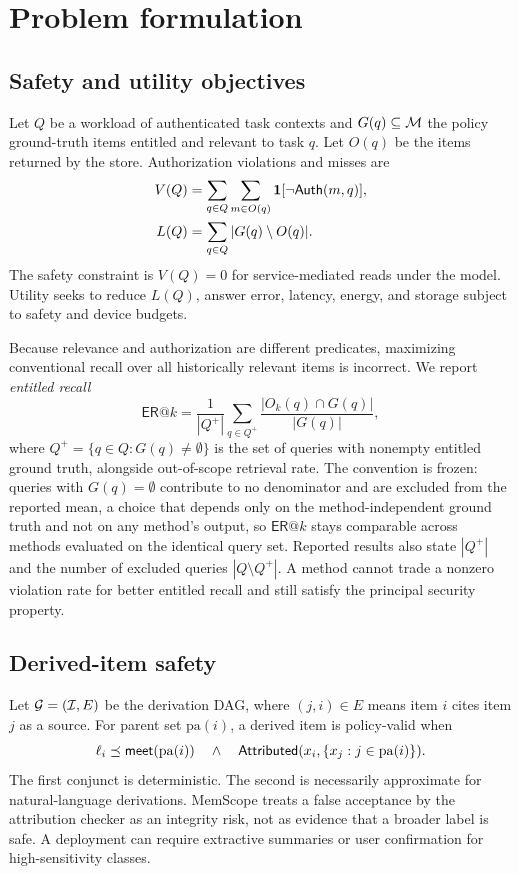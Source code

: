 \section{Problem formulation}
\label{sec:problem}

\subsection{Safety and utility objectives}

Let $Q$ be a workload of authenticated task contexts and $G(q)\subseteq\mathcal{M}$ the policy ground-truth items entitled and relevant to task $q$. Let $O(q)$ be the items returned by the store. Authorization violations and misses are
\begin{align}
V(Q)&=\sum_{q\in Q}\sum_{m\in O(q)}\mathbf{1}[\neg\mathsf{Auth}(m,q)],\\
L(Q)&=\sum_{q\in Q}|G(q)\setminus O(q)|.
\end{align}
The safety constraint is $V(Q)=0$ for service-mediated reads under the model. Utility seeks to reduce $L(Q)$, answer error, latency, energy, and storage subject to safety and device budgets.

Because relevance and authorization are different predicates, maximizing conventional recall over all historically relevant items is incorrect. We report \emph{entitled recall}
\begin{equation}
\mathsf{ER@}k=\frac{1}{|Q^{+}|}\sum_{q\in Q^{+}}\frac{|O_k(q)\cap G(q)|}{|G(q)|},
\label{eq:er}
\end{equation}
where $Q^{+}=\{q\in Q: G(q)\ne\emptyset\}$ is the set of queries with nonempty entitled ground truth, alongside out-of-scope retrieval rate. The convention is frozen: queries with $G(q)=\emptyset$ contribute to no denominator and are excluded from the reported mean, a choice that depends only on the method-independent ground truth and not on any method's output, so $\mathsf{ER@}k$ stays comparable across methods evaluated on the identical query set. Reported results also state $|Q^{+}|$ and the number of excluded queries $|Q\setminus Q^{+}|$. A method cannot trade a nonzero violation rate for better entitled recall and still satisfy the principal security property.

\subsection{Derived-item safety}

Let $\mathcal{G}=(\mathcal{I},E)$ be the derivation DAG, where $(j,i)\in E$ means item $i$ cites item $j$ as a source. For parent set $\mathrm{pa}(i)$, a derived item is policy-valid when
\begin{equation}
\ell_i\preceq\mathsf{meet}(\mathrm{pa}(i))
\quad\wedge\quad
\mathsf{Attributed}(x_i,\{x_j:j\in\mathrm{pa}(i)\}).
\label{eq:derived-validity}
\end{equation}
The first conjunct is deterministic. The second is necessarily approximate for natural-language derivations. MemScope treats a false acceptance by the attribution checker as an integrity risk, not as evidence that a broader label is safe. A deployment can require extractive summaries or user confirmation for high-sensitivity classes.

